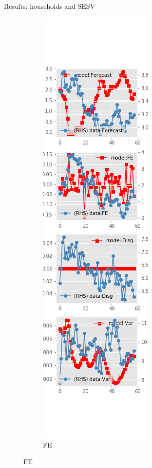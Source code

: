 \documentclass{beamer}
\begin{document}
\begin{frame}{Results: households and SESV}
\begin{figure}[ht]
\begin{subfigure}[b]{0.19\textwidth}
		\end{subfigure}
		\hfill
		\begin{subfigure}[b]{0.19\textwidth}
			\caption{FE}
			\includegraphics[width=\textwidth, height = 0.8\textheight]{figuresDraft/sce_se_est_sv_diag1.png}

\end{subfigure}
\end{figure}
\end{frame}
\end{document}
